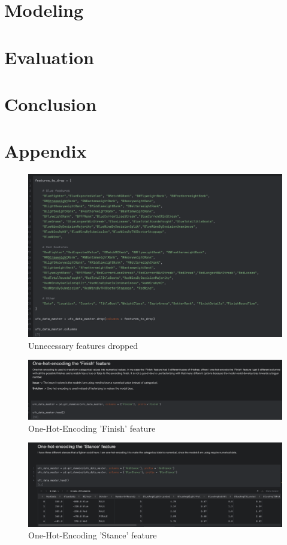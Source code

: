 \documentclass{article}
\begin{document}
	\section{Modeling}
	\section{Evaluation}
	\section{Conclusion}
  \section{Appendix}

  \begin{figure}
    \centering
    \includegraphics[width=1\textwidth]{images/Features_Dropped.png}
    \caption{Unnecessary features dropped}
    \label{fig:features_dropped}
  \end{figure}

  \begin{figure}
    \centering
    \includegraphics[width=1\textwidth]{images/One_hot_encoding_finish.png}
    \caption{One-Hot-Encoding 'Finish' feature}
    \label{fig:One_hot_encoding_finish}
  \end{figure}

  \begin{figure}
    \centering
    \includegraphics[width=1\textwidth]{images/One_hot_encodiong_Stance.png}
    \caption{One-Hot-Encoding 'Stance' feature}
    \label{fig:One_hot_encoding_stance}
  \end{figure}
\end{document}
